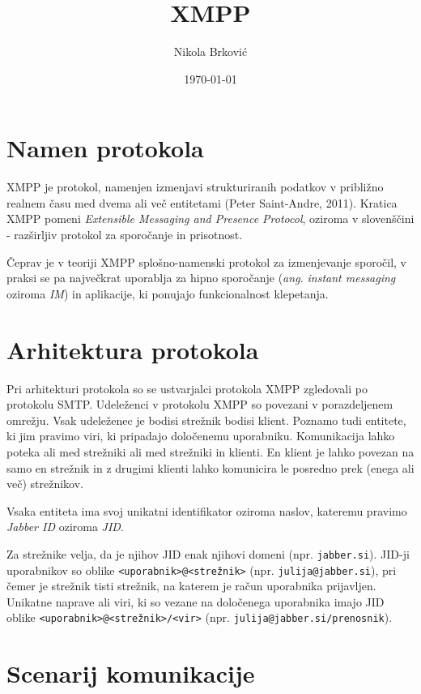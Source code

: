 \documentclass[11pt]{article}
\author{Nikola Brković}
\date{\today}
\title{XMPP}
\begin{document}
\maketitle

\section{Namen protokola}
\label{sec:org576612c}

XMPP je protokol, namenjen izmenjavi strukturiranih podatkov v
približno realnem času med dvema ali več entitetami
(Peter Saint-Andre, 2011). Kratica XMPP pomeni \emph{Extensible Messaging and
Presence Protocol}, oziroma v slovenščini - razširljiv protokol za
sporočanje in prisotnost.

Čeprav je v teoriji XMPP splošno-namenski protokol za izmenjevanje
sporočil, v praksi se pa največkrat uporablja za hipno sporočanje
(\emph{ang.} \emph{instant messaging} oziroma \emph{IM}) in aplikacije, ki ponujajo
funkcionalnost klepetanja.

\section{Arhitektura protokola}
\label{sec:org4ba672e}

Pri arhitekturi protokola so se ustvarjalci protokola XMPP zgledovali
po protokolu SMTP. Udeleženci v protokolu XMPP so povezani v
porazdeljenem omrežju. Vsak udeleženec je bodisi strežnik bodisi
klient. Poznamo tudi entitete, ki jim pravimo viri, ki pripadajo
določenemu uporabniku. Komunikacija lahko poteka ali med strežniki ali
med strežniki in klienti. En klient je lahko povezan na samo en
strežnik in z drugimi klienti lahko komunicira le posredno prek (enega
ali več) strežnikov.

Vsaka entiteta ima svoj unikatni identifikator oziroma naslov,
kateremu pravimo \emph{Jabber ID} oziroma \emph{JID}.

Za strežnike velja, da je njihov JID enak njihovi domeni
(npr. \texttt{jabber.si}).  JID-ji uporabnikov so oblike
\texttt{<uporabnik>@<strežnik>} (npr. \texttt{julija@jabber.si}), pri čemer je
strežnik tisti strežnik, na katerem je račun uporabnika
prijavljen. Unikatne naprave ali viri, ki so vezane na določenega
uporabnika imajo JID oblike \texttt{<uporabnik>@<strežnik>/<vir>}
(npr. \texttt{julija@jabber.si/prenosnik}).

\section{Scenarij komunikacije}
\label{sec:orgd392035}
\end{document}
